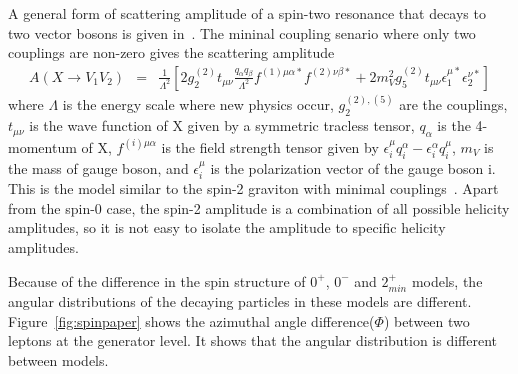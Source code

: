 A general form of scattering amplitude of a spin-two resonance that decays to two vector 
bosons is given in~\cite{Bolognesi:2012mm}. The mininal coupling senario 
where only two couplings are non-zero gives the scattering amplitude 
\begin{eqnarray} 
A(X \rightarrow V_1V_2)
&=& 
\frac{1}{\Lambda^2}  
\left[ 
2 g_2^{(2)} t_{\mu\nu} \frac{q_\alpha q_\beta}{\Lambda^2} 
f^{(1)\mu\alpha*} f^{(2)\nu\beta*} 
+ 
2 m_V^2 g_5^{(2)} t_{\mu\nu} 
\epsilon^{\mu*}_1 \epsilon^{\nu*}_2 
\right] 
\end{eqnarray} 
where $\Lambda$ is the energy scale where new physics occur, 
$g_2^{(2),(5)}$ are the couplings, 
$t_{\mu\nu}$ is the wave function of X given by a symmetric tracless tensor, 
$q_{\alpha}$ is the 4-momentum of X, 
$f^{(i)\mu\alpha}$ is the field strength tensor given by 
    $\epsilon_i^\mu q_i^\alpha - \epsilon_i^\alpha q_i^\mu$, 
$m_V$ is the mass of gauge boson, and 
$\epsilon_i^{\mu}$ is the polarization vector of the gauge boson i.
This is the model similar to the spin-2 graviton with minimal couplings~\cite{Bolognesi:2012mm}. 
Apart from the spin-0 case, the spin-2 amplitude is a combination of 
all possible helicity amplitudes, so it is not easy to isolate the 
amplitude to specific helicity amplitudes. 

Because of the difference in the spin structure of $0^+$, $0^-$ and $2_{min}^+$ models, 
the angular distributions of the decaying particles in these models are different.  
Figure~\ref{fig:spinpaper} shows the azimuthal angle difference($\Phi$) between 
two leptons at the generator level. It shows that the angular distribution is 
different between models. 



